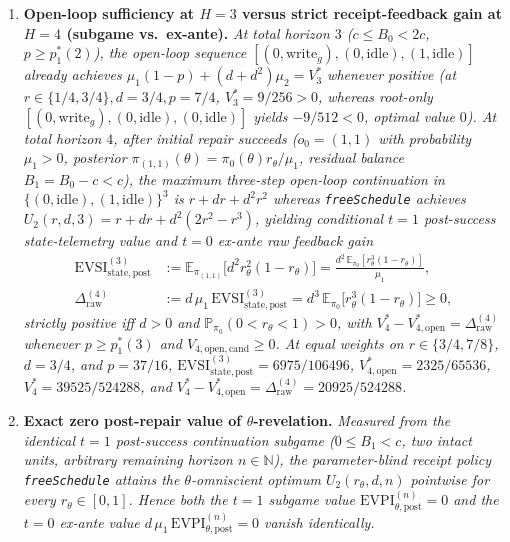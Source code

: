 \documentclass[11pt,letterpaper]{article}
\begin{document}
\begin{enumerate}
{  exact loss \(3/640\) (and at \(p = 6/5 < 5/4\), \(m^* = 2\) becomes
  optimal with \(V_3^* = 89/640\)).}
\item
  \textbf{Open-loop sufficiency at \(H=3\) versus strict
  receipt-feedback gain at \(H=4\) (subgame vs.~ex-ante).} \emph{At
  total horizon \(3\) (\(c \le B_0 < 2c\), \(p \ge p_1^*(2)\)), the
  open-loop sequence
  \([(0, \mathrm{write}_g), (0, \mathrm{idle}), (1, \mathrm{idle})]\)
  already achieves \(\mu_1(1-p) + (d + d^2)\mu_2 = V_3^*\) whenever
  positive (at \(r \in \{1/4, 3/4\}, d = 3/4, p = 7/4\),
  \(V_3^* = 9/256 > 0\), whereas root-only
  \([(0, \mathrm{write}_g), (0, \mathrm{idle}), (0, \mathrm{idle})]\)
  yields \(-9/512 < 0\), optimal value \(0\)). At total horizon \(4\),
  after initial repair succeeds (\(o_0 = (1,1)\) with probability
  \(\mu_1 > 0\), posterior
  \(\pi_{(1,1)}(\theta) = \pi_0(\theta)r_\theta / \mu_1\), residual
  balance \(B_1 = B_0 - c < c\)), the maximum three-step open-loop
  continuation in \(\{(0, \mathrm{idle}), (1, \mathrm{idle})\}^3\) is
  \(r + dr + d^2 r^2\) whereas \texttt{freeSchedule} achieves
  \(U_2(r, d, 3) = r + dr + d^2(2r^2 - r^3)\), yielding conditional
  \(t = 1\) post-success state-telemetry value and \(t = 0\) ex-ante raw
  feedback gain} \[\begin{aligned}
  \mathrm{EVSI}_{\mathrm{state,post}}^{(3)} &:= \mathbb{E}_{\pi_{(1,1)}}\!\bigl[d^2 r_\theta^2(1 - r_\theta)\bigr] = \frac{d^2\,\mathbb{E}_{\pi_0}[r_\theta^3(1 - r_\theta)]}{\mu_1}, \\
  \Delta_{\mathrm{raw}}^{(4)} &:= d\,\mu_1\,\mathrm{EVSI}_{\mathrm{state,post}}^{(3)} = d^3\,\mathbb{E}_{\pi_0}\!\bigl[r_\theta^3(1 - r_\theta)\bigr] \ge 0,
  \end{aligned}\] \emph{strictly positive iff \(d > 0\) and
  \(\mathbb{P}_{\pi_0}(0 < r_\theta < 1) > 0\), with
  \(V_4^* - V_{4,\mathrm{open}}^* = \Delta_{\mathrm{raw}}^{(4)}\)
  whenever \(p \ge p_1^*(3)\) and \(V_{4,\mathrm{open,cand}} \ge 0\). At
  equal weights on \(r \in \{3/4, 7/8\}\), \(d = 3/4\), and
  \(p = 37/16\),
  \(\mathrm{EVSI}_{\mathrm{state,post}}^{(3)} = 6975 / 106496\),
  \(V_{4,\mathrm{open}}^* = 2325 / 65536\), \(V_4^* = 39525 / 524288\),
  and
  \(V_4^* - V_{4,\mathrm{open}}^* = \Delta_{\mathrm{raw}}^{(4)} = 20925 / 524288\).}
\item
  \textbf{Exact zero post-repair value of \(\theta\)-revelation.}
  \emph{Measured from the identical \(t = 1\) post-success continuation
  subgame (\(0 \le B_1 < c\), two intact units, arbitrary remaining
  horizon \(n \in \mathbb{N}\)), the parameter-blind receipt policy
  \texttt{freeSchedule} attains the \(\theta\)-omniscient optimum
  \(U_2(r_\theta, d, n)\) pointwise for every \(r_\theta \in [0,1]\).
  Hence both the \(t = 1\) subgame value
  \(\mathrm{EVPI}_{\theta,\mathrm{post}}^{(n)} = 0\) and the \(t = 0\)
  ex-ante value
  \(d\,\mu_1\,\mathrm{EVPI}_{\theta,\mathrm{post}}^{(n)} = 0\) vanish
  identically.}
\end{enumerate}
\end{document}
